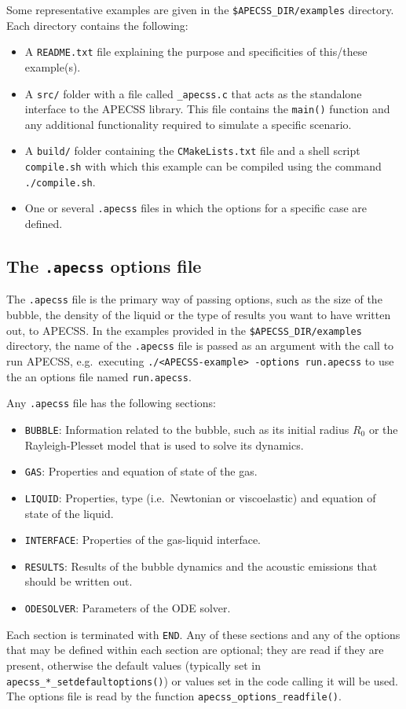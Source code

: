 Some representative examples are given in the {\tt \$APECSS\_DIR/examples} directory. Each directory contains the following:\vspace{-1em}
\begin{itemize}[noitemsep]
  \item A {\tt README.txt} file explaining the purpose and specificities of this/these example(s).
  \item A {\tt src/} folder with a file called {\tt *\_apecss.c} that acts as the standalone interface to the APECSS library. This file contains the {\tt main()} function and any additional functionality required to simulate a specific scenario.
  \item A {\tt build/} folder containing the {\tt CMakeLists.txt} file and a shell script {\tt compile.sh} with which this example can be compiled using the command {\tt ./compile.sh}.
  \item One or several {\tt *.apecss} files in which the options for a specific case are defined.
\end{itemize}

\subsection{The {\tt *.apecss} options file}

The {\tt *.apecss} file is the primary way of passing options, such as the size of the bubble, the density of the liquid or the type of results you want to have written out, to APECSS. In the examples provided in the {\tt \$APECSS\_DIR/examples} directory, the name of the  {\tt *.apecss} file is passed as an argument with the call to run APECSS, e.g.~executing {\tt ./<APECSS-example> -options run.apecss} to use the an options file named {\tt run.apecss}.

Any {\tt *.apecss} file has the following sections:
\vspace{-1em}
\begin{itemize}[noitemsep]
  \item {\tt BUBBLE}: Information related to the bubble, such as its initial radius $R_0$ or the Rayleigh-Plesset model that is used to solve its dynamics.
  \item {\tt GAS}: Properties and equation of state of the gas.
  \item {\tt LIQUID}: Properties, type (i.e.~Newtonian or viscoelastic) and equation of state of the liquid.
  \item {\tt INTERFACE}: Properties of the gas-liquid interface. 
  \item {\tt RESULTS}: Results of the bubble dynamics and the acoustic emissions that should be written out.
  \item {\tt ODESOLVER}: Parameters of the ODE solver.
\end{itemize}
Each section is terminated with {\tt END}. Any of these sections and any of the options that may be defined within each section are optional; they are read if they are present, otherwise the default values (typically set in {\tt apecss\_*\_setdefaultoptions()}) or values set in the code calling it will be used. The options file is read by the function {\tt apecss\_options\_readfile()}.

